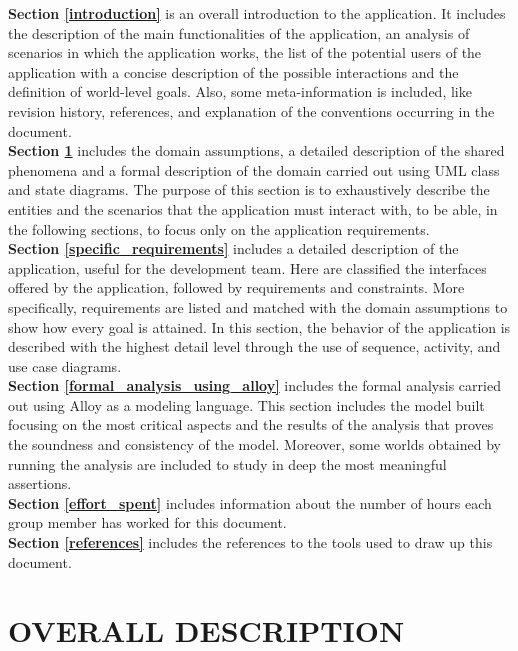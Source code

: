 \documentclass[a4paper]{article}
\begin{document}
\textbf{Section \ref{introduction}} is an overall introduction to the
application. It includes the description of the main functionalities of the
application, an analysis of scenarios in which the application works, the list
of the potential users of the application with a concise description of the
possible interactions and the definition of world-level goals. Also,
some meta-information is included, like revision history, references,
and explanation of the conventions occurring in the document.
\medskip\\
\textbf{Section \ref{overall_description}} includes the domain assumptions, a
detailed description of the shared phenomena and a formal description of the
domain carried out using UML class and state diagrams. The purpose of
this section is to exhaustively describe the entities and the scenarios
that the application must interact with, to be able, in the following
sections, to focus only on the application requirements.
\medskip\\
\textbf{Section \ref{specific_requirements}} includes a detailed description of
the application, useful for the development team. Here are classified the
interfaces offered by the application, followed by requirements and
constraints. More specifically, requirements are listed and matched with the
domain assumptions to show how every goal is attained. In this section, the
behavior of the application is described with the highest detail level
through the use of sequence, activity, and use case diagrams.
\medskip\\
\textbf{Section \ref{formal_analysis_using_alloy}} includes the formal analysis
carried out using Alloy as a modeling language. This section includes the model
built focusing on the most critical aspects and the results of the analysis
that proves the soundness and consistency of the model. Moreover, some worlds
obtained by running the analysis are included to study in deep the most
meaningful assertions.
\medskip\\
\textbf{Section \ref{effort_spent}} includes information about the number of
hours each group member has worked for this document.
\medskip\\
\textbf{Section \ref{references}} includes the references to the tools used to
draw up this document.

\newpage

\section{OVERALL DESCRIPTION}\label{overall_description}
\end{document}
